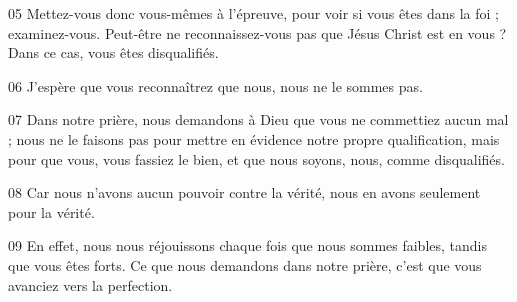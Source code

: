 
05 Mettez-vous donc vous-mêmes à l’épreuve, pour voir si vous êtes dans la foi ; examinez-vous. Peut-être ne reconnaissez-vous pas que Jésus Christ est en vous ? Dans ce cas, vous êtes disqualifiés.

06 J’espère que vous reconnaîtrez que nous, nous ne le sommes pas.

07 Dans notre prière, nous demandons à Dieu que vous ne commettiez aucun mal ; nous ne le faisons pas pour mettre en évidence notre propre qualification, mais pour que vous, vous fassiez le bien, et que nous soyons, nous, comme disqualifiés.

08 Car nous n’avons aucun pouvoir contre la vérité, nous en avons seulement pour la vérité.

09 En effet, nous nous réjouissons chaque fois que nous sommes faibles, tandis que vous êtes forts. Ce que nous demandons dans notre prière, c’est que vous avanciez vers la perfection.
